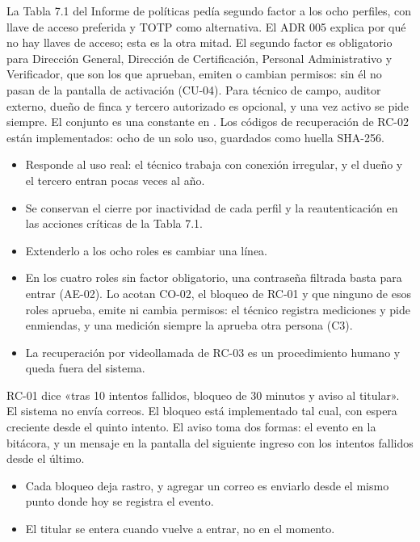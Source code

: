 \documentclass[11pt,a4paper]{article}
\theoremstyle{definition}
\theoremstyle{remark}
\begin{document}
\adrctx La Tabla 7.1 del Informe de políticas pedía segundo factor a los ocho
perfiles, con llave de acceso preferida y TOTP como alternativa. El ADR 005
explica por qué no hay llaves de acceso; esta es la otra mitad.
\adrdec El segundo factor es obligatorio para Dirección General, Dirección de
Certificación, Personal Administrativo y Verificador, que son los que
aprueban, emiten o cambian permisos: sin él no pasan de la pantalla de
activación (CU-04). Para técnico de campo, auditor externo, dueño de finca y
tercero autorizado es opcional, y una vez activo se pide siempre. El conjunto
es una constante en . Los códigos de
recuperación de RC-02 están implementados: ocho de un solo uso, guardados
como huella SHA-256.
\adrpos
\begin{itemize}
  \item Responde al uso real: el técnico trabaja con conexión irregular, y el
    dueño y el tercero entran pocas veces al año.
  \item Se conservan el cierre por inactividad de cada perfil y la
    reautenticación en las acciones críticas de la Tabla 7.1.
  \item Extenderlo a los ocho roles es cambiar una línea.
\end{itemize}
\adrneg
\begin{itemize}
  \item En los cuatro roles sin factor obligatorio, una contraseña filtrada
    basta para entrar (AE-02). Lo acotan CO-02, el bloqueo de RC-01 y que
    ninguno de esos roles aprueba, emite ni cambia permisos: el técnico
    registra mediciones y pide enmiendas, y una medición siempre la aprueba
    otra persona (C3).
  \item La recuperación por videollamada de RC-03 es un procedimiento humano y
    queda fuera del sistema.
\end{itemize}

\adrctx RC-01 dice «tras 10 intentos fallidos, bloqueo de 30 minutos y aviso al
titular». El sistema no envía correos.
\adrdec El bloqueo está implementado tal cual, con espera creciente desde el
quinto intento. El aviso toma dos formas: el evento
 en la bitácora, y un mensaje en la pantalla del
siguiente ingreso con los intentos fallidos desde el último.
\adrpos
\begin{itemize}
  \item Cada bloqueo deja rastro, y agregar un correo es enviarlo desde el
    mismo punto donde hoy se registra el evento.
\end{itemize}
\adrneg
\begin{itemize}
  \item El titular se entera cuando vuelve a entrar, no en el momento.
\end{itemize}
\end{document}
